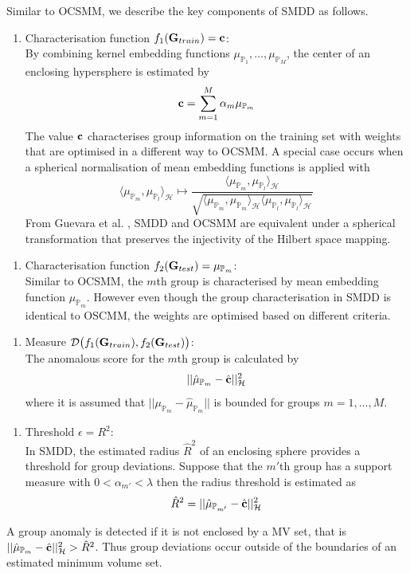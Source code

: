  Similar to OCSMM, we describe the key components of SMDD as follows.
 \begin{enumerate}[1.]
\item Characterisation function $f_1({\bf G}_{train})= {\bf c}$: \\
 By combining kernel embedding functions  $\mu_{\mathbb{P}_1},\dots, \mu_{\mathbb{P}_M}$, the center of an enclosing hypersphere is estimated by  
\[{\bf c}= \sum_{m=1}^M \alpha_m  \mu_{\mathbb{P}_m}\] 
The value $\bf c$ characterises  group information on the training set with weights that are optimised in a different way to OCSMM. A special case occurs when a spherical normalisation of mean embedding functions is applied with   
\[  \langle \mu_{\mathbb{P}_m}, \mu_{\mathbb{P}_l}\rangle_\mathcal{H} \mapsto  \frac{ \langle \mu_{\mathbb{P}_m}, \mu_{\mathbb{P}_l}\rangle_\mathcal{H}} { \sqrt{\langle \mu_{\mathbb{P}_m}, \mu_{\mathbb{P}_m}\rangle_\mathcal{H}  \langle \mu_{\mathbb{P}_l}, \mu_{\mathbb{P}_l}\rangle_\mathcal{H}}} \]
From Guevara et al. \cite{SMDD},  SMDD and OCSMM are equivalent under a spherical transformation  that preserves the injectivity  of the Hilbert space mapping.
 \end{enumerate}
%
 \begin{enumerate}[2.]
\item Characterisation function $f_2({\bf G}_{test})=\mu_{\mathbb{P}_m}$: \\ 
Similar to OCSMM, the $m$th group is characterised by  mean embedding function $\mu_{\mathbb{P}_m}$. However even though the group characterisation in SMDD is identical to OSCMM, the weights are optimised based on different criteria. \end{enumerate}
\begin{enumerate}[3.]
\item Measure $ \mathcal{D}\big( f_1({\bf G}_{train}), f_2({\bf G}_{test})\big )$: \\
The anomalous score for the $m$th group is calculated by \[ || \hat{\mu}_{\mathbb{P}_m} -  \hat{\bf c} ||^2_\mathcal{H}  \]
where it is assumed that  $||  \mu_{\mathbb{P}_m}  - \hat{\mu}_{ {\mathbb{P}}_m } || $ is bounded  for   groups $m=1,\dots,M$. 
\end{enumerate}
%
\begin{enumerate}[4.]
\item Threshold $\epsilon={R}^2$: \\ In SMDD, the estimated radius 
$\hat{R}^2$   of an enclosing sphere provides a threshold for group deviations.  Suppose that the $m'$th group has a support measure with $ 0 <\alpha_{m'} < \displaystyle \lambda$ then the radius threshold is estimated as
\[ \hat{R}^2  =  || \hat{\mu}_{\mathbb{P}_ {m'} } -  \hat{\bf c} ||_\mathcal{H}^2  \]
\end{enumerate}
A group anomaly is detected if it is not enclosed by a MV set, that is 
$ || \hat{\mu}_{\mathbb{P}_{m} } -  \hat{\bf c} ||^2_\mathcal{H} > \hat{R}^2$. Thus  group deviations occur  outside of the boundaries of an estimated minimum volume set. 

